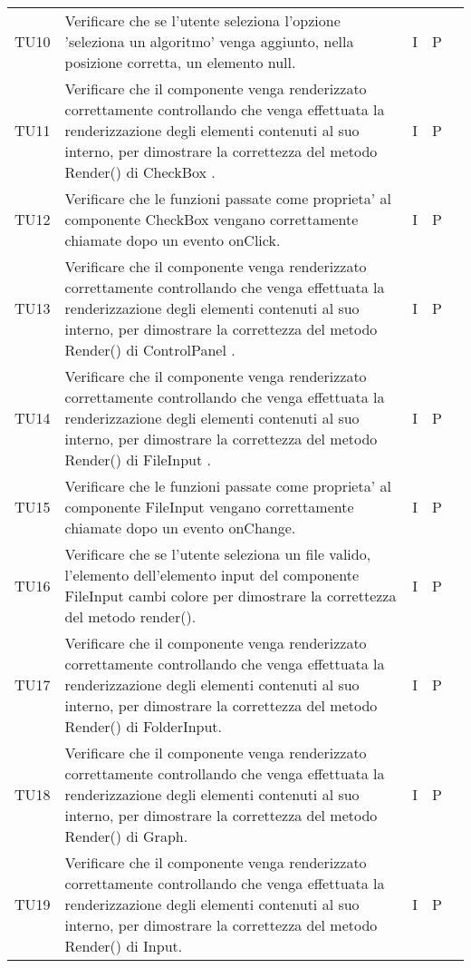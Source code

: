 \begin{longtable} {
		>{}p{15mm} 
		>{}p{79.5mm}
		>{}p{15mm} 
		>{}p{15mm}
		>{}p{0mm}}
	TU10		& Verificare che se l'utente seleziona l'opzione 'seleziona un algoritmo' venga aggiunto, nella posizione corretta, un elemento null.& I & P &\TBstrut \\ [2mm]
	TU11		& Verificare che il componente venga renderizzato correttamente controllando che venga effettuata la renderizzazione degli elementi contenuti al suo interno, per dimostrare la correttezza del metodo Render() di  CheckBox .& I & P &\TBstrut \\ [2mm]
	TU12		& Verificare che le funzioni passate come proprieta' al componente CheckBox vengano correttamente chiamate dopo un evento onClick.& I & P &\TBstrut \\ [2mm]
	TU13		& Verificare che il componente venga renderizzato correttamente controllando che venga effettuata la renderizzazione degli elementi contenuti al suo interno, per dimostrare la correttezza del metodo Render() di  ControlPanel .& I & P &\TBstrut \\ [2mm]
	TU14		& Verificare che il componente venga renderizzato correttamente controllando che venga effettuata la renderizzazione degli elementi contenuti al suo interno, per dimostrare la correttezza del metodo Render() di FileInput .& I & P &\TBstrut \\ [2mm]
	TU15		& Verificare che le funzioni passate come proprieta' al componente FileInput vengano correttamente chiamate dopo un evento onChange.& I & P &\TBstrut \\ [2mm]
	TU16		& Verificare che se l'utente seleziona un file valido, l'elemento dell'elemento input del componente FileInput cambi colore per dimostrare la correttezza del metodo render().& I & P &\TBstrut \\ [2mm]
	TU17		& Verificare che il componente venga renderizzato correttamente controllando che venga effettuata la renderizzazione degli elementi contenuti al suo interno, per dimostrare la correttezza del metodo Render() di  FolderInput.& I & P &\TBstrut \\ [2mm]
	TU18		& Verificare che il componente venga renderizzato correttamente controllando che venga effettuata la renderizzazione degli elementi contenuti al suo interno, per dimostrare la correttezza del metodo Render() di  Graph.& I & P &\TBstrut \\ [2mm]
	TU19		& Verificare che il componente venga renderizzato correttamente controllando che venga effettuata la renderizzazione degli elementi contenuti al suo interno, per dimostrare la correttezza del metodo Render() di  Input.& I & P &\TBstrut \\ [2mm]

\end{longtable}
